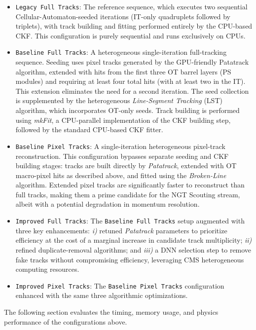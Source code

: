\documentclass[a4paper,11pt]{article}
\begin{document}
\begin{itemize}
\item \texttt{Legacy Full Tracks}: The reference sequence, which executes two sequential Cellular-Automaton-seeded iterations (IT-only quadruplets followed by triplets), with track building and fitting performed entirely by the CPU-based CKF. This configuration is purely sequential and runs exclusively on CPUs.
\item \texttt{Baseline Full Tracks}: A heterogeneous single-iteration full-tracking sequence. Seeding uses pixel tracks generated by the GPU-friendly Patatrack algorithm, extended with hits from the first three OT barrel layers (PS modules) and requiring at least four total hits (with at least two in the IT). This extension eliminates the need for a second iteration. The seed collection is supplemented by the heterogeneous \textit{Line-Segment Tracking} (LST) algorithm, which incorporates OT-only seeds. Track building is performed using \textit{mkFit}, a CPU-parallel implementation of the CKF building step, followed by the standard CPU-based CKF fitter.
\item \texttt{Baseline Pixel Tracks}: A single-iteration heterogeneous pixel-track reconstruction. This configuration bypasses separate seeding and CKF building stages: tracks are built directly by \textit{Patatrack}, extended with OT macro-pixel hits as described above, and fitted using the \textit{Broken-Line} algorithm. Extended pixel tracks are significantly faster to reconstruct than full tracks, making them a prime candidate for the NGT Scouting stream, albeit with a potential degradation in momentum resolution.
\item \texttt{Improved Full Tracks}: The \texttt{Baseline Full Tracks} setup augmented with three key enhancements:
  \textit{i)} retuned \textit{Patatrack} parameters to prioritize efficiency at the cost of a marginal increase in candidate track multiplicity;
  \textit{ii)} refined duplicate-removal algorithms; and
  \textit{iii)} a DNN selection step to remove fake tracks without compromising efficiency, leveraging CMS heterogeneous computing resources.
\item \texttt{Improved Pixel Tracks}: The \texttt{Baseline Pixel Tracks} configuration enhanced with the same three algorithmic optimizations.
\end{itemize}

\noindent The following section evaluates the timing, memory usage, and physics performance of the configurations above. \par
\end{document}
